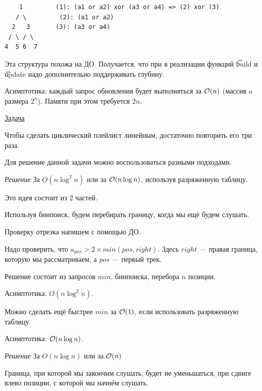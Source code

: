 \begin{verbatim}
    1         (1): (a1 or a2) xor (a3 or a4) => (2) xor (3)
   / \	       (2): (a1 or a2) 
  2   3       (3): (a3 or a4)
 / \ / \
4  5 6  7      
\end{verbatim}

Эта структура похожа на ДО. Получается, что при в реализации функций \t{build} и \t{update} надо дополнительно поддерживать глубину.

Асимптотика: каждый запрос обновления будет выполняться за $\mathcal{O}(n)$ (массив $a$ размера $2^n$). Памяти при этом требуется $2n$.

\pagebreak


\href{https://codeforces.com/problemset/problem/1237/D}{Задача}

Чтобы сделать циклический плейлист линейным, достаточно повторить его три раза.

Для решение данной задачи можно воспользоваться разными подходами. 

{\it Решение } За $O(n \log^2 n)$ или за $\mathcal{O}(n \log n)$, используя разряженную таблицу.

Это идея состоит из 2 частей.
\up \up
\begin{MyList}[0pt]
	\item Используя бинпоиск, будем перебирать границу, когда мы ещё будем слушать.
	\item Проверку отрезка напишем с помощью ДО.
	
	Надо проверить, что $a_{pos} > 2 \times min(pos, right)$. Здесь $right$ --- правая граница, которую мы рассматриваем, а $pos$ --- первый трек.
\end{MyList}
\up \up
Решение состоит из запросов $min$, бинпоиска, перебора $n$ позиции.

Асимптотика: $O(n \log^2 n)$.
\down

Можно сделать ещё быстрее $min$ за $\mathcal{O}(1)$, если использовать разряженную таблицу.

Асимптотика: $\mathcal{O}(n \log n)$. \href{https://codeforces.com/contest/1237/submission/62698504}{} \href{https://codeforces.com/contest/1237/submission/63401681}{}

\down

{\it Решение } За $O(n \log n)$ или за $\mathcal{O}(n)$ \href{https://codeforces.com/contest/1237/submission/62704110}{}

\begin{Prop}Граница, при которой мы закончим слушать, будет не уменьшаться, при сдвиге влево позиции, с которой мы начнём слушать.\end{Prop}


